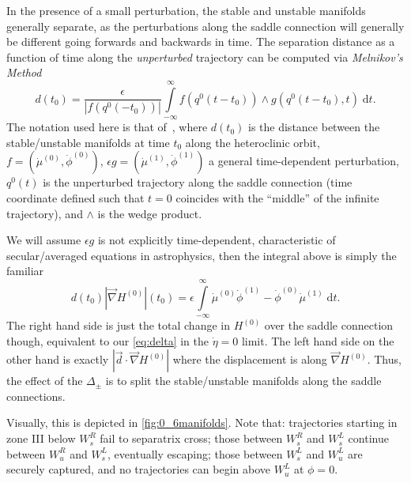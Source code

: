 \documentclass[
        fleqn,
        usenatbib,
    ]{mnras}
\newcommand*{\abs}[1]{\left|#1\right|}
\newcommand*{\p}[1]{\left(#1\right)}
\begin{document}
In the presence of a small perturbation, the stable and unstable manifolds
generally separate, as the perturbations along the saddle connection will
generally be different going forwards and backwards in time. The separation
distance as a function of time along the \emph{unperturbed} trajectory can be
computed via \emph{Melnikov's Method}
\begin{equation}
    d(t_0) = \frac{\epsilon}{\abs{f(q^0(-t_0))}}
        \int\limits_{-\infty}^\infty
            f(q^0(t - t_0)) \wedge g(q^0(t - t_0), t)\;\mathrm{d}t.
\end{equation}
The notation used here is that of~\cite{g_and_h}, where $d(t_0)$ is the distance
between the stable/unstable manifolds at time $t_0$ along the heteroclinic
orbit, $f = \p{\dot{\mu}^{(0)}, \dot{\phi}^{(0)}}$, $\epsilon g =
\p{\dot{\mu}^{(1)}, \dot{\phi}^{(1)}}$ a general time-dependent perturbation,
$q^0(t)$ is the unperturbed trajectory along the saddle connection (time
coordinate defined such that $t = 0$ coincides with the ``middle'' of the
infinite trajectory), and $\wedge$ is the wedge product.

We will assume $\epsilon g$ is not explicitly time-dependent, characteristic of
secular/averaged equations in astrophysics, then the integral above is simply
the familiar
\begin{equation}
    d(t_0) \abs{\vec{\nabla}H^{(0)}}(t_0) = \epsilon \int\limits_{-\infty}^\infty
        \dot{\mu}^{(0)}\dot{\phi}^{(1)} - \dot{\phi}^{(0)}\dot{\mu}^{(1)}
            \;\mathrm{d}t.\label{eq:melnikov}
\end{equation}
The right hand side is just the total change in $H^{(0)}$ over the saddle
connection though, equivalent to our \autoref{eq:delta} in the $\dot{\eta} = 0$
limit. The left hand side on the other hand is exactly $\abs{\vec{d} \cdot
\vec{\nabla}H^{(0)}}$ where the displacement is along $\vec{\nabla}H^{(0)}$.
Thus, the effect of the $\Delta_{\pm}$ is to split the stable/unstable manifolds
along the saddle connections.

Visually, this is depicted in \autoref{fig:0_6manifolds}. Note that:
trajectories starting in zone III below $W_s^{R}$ fail to separatrix cross;
those between $W_s^{R}$ and $W_s^{L}$ continue between $W_u^{R}$ and $W_s^{L}$,
eventually escaping; those between $W_s^{L}$ and $W_u^{L}$ are securely
captured, and no trajectories can begin above $W_u^{L}$ at $\phi = 0$.
\end{document}
